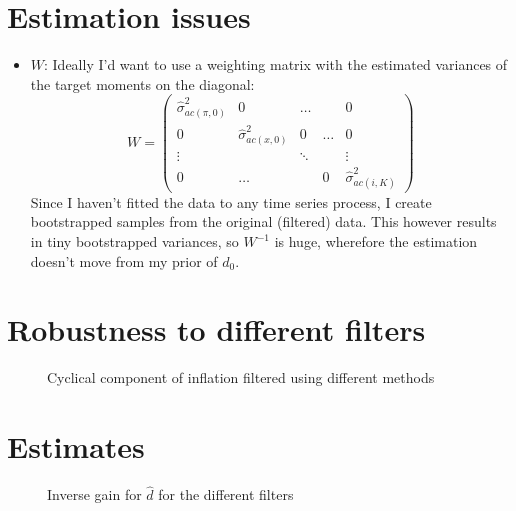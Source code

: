 \documentclass[11pt]{article}
\def \myFigPath {../figures/}
\renewcommand{\[}{\begin{equation}}
\renewcommand{\]}{\end{equation}}
\def\myAdjustableFigScale{0.14}
\begin{document}
\section{Estimation issues}
\begin{itemize}
\item $W$:
Ideally I'd want to use a weighting matrix with the estimated variances of the target moments on the diagonal:
\begin{equation}
W = \begin{pmatrix} \hat{\sigma}^2_{ac(\pi,0)} & 0 &\dots &   & 0 \\
 0 & \hat{\sigma}^2_{ac(x,0)} & 0 & \dots & 0 \\
 \vdots & & \ddots & & \vdots \\
 0 & \dots &  & 0 & \hat{\sigma}^2_{ac(i,K)}
\end{pmatrix}
\end{equation}
Since I haven't fitted the data to any time series process, I create bootstrapped samples from the original (filtered) data. This however results in tiny bootstrapped variances, so $W^{-1}$ is huge, wherefore the estimation doesn't move from my prior of $d_0$. 

\end{itemize}


\section{Robustness to different filters}
\begin{figure}[h!]
\caption{Cyclical component of inflation filtered using different methods}
\end{figure}

\newpage
\section{Estimates}

\begin{figure}[h!]
\caption{Inverse gain for $\hat{d}$ for the different filters}
\end{figure}
\end{document}
